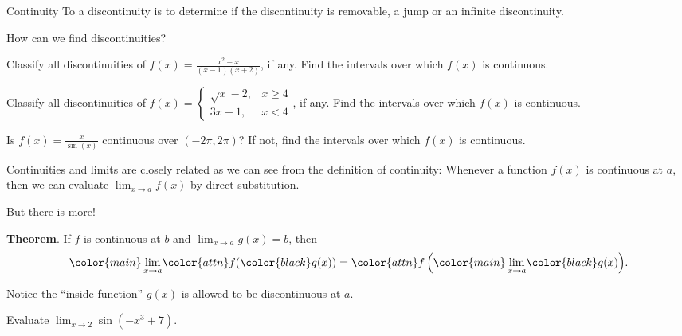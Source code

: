 \documentclass[../main.tex]{subfiles}
\begin{document}
\begin{lesson}{Continuity}
  To  a discontinuity is to determine if the discontinuity is removable, a jump or an infinite discontinuity.

  \faComments{} How can we find discontinuities?

  \begin{example}
    Classify all discontinuities of \(f(x) = \frac{x^{2}-x}{(x-1)(x+2)}\), if any.  Find the intervals over which \(f(x)\) is continuous.

  \end{example}

  \begin{example}
    Classify all discontinuities of \(f(x) = \begin{cases} \sqrt{x} - 2,& x \ge 4 \\ 3x - 1, &x < 4\end{cases}\), if any.  Find the intervals over which \(f(x)\) is continuous.

  \end{example}
  \clearpage

  \begin{example}
    Is \(f(x) = \frac{x}{\sin(x)}\) continuous over \((-2\pi, 2\pi)\)? If not, find the intervals over which \(f(x)\) is continuous.
  \end{example}

  
  Continuities and limits are closely related as we can see from the definition of continuity: Whenever a function \(f(x)\) is {continuous} at \(a\), then we can evaluate \(\lim_{x \to a} f(x)\) by direct substitution. 

  But there is more!

  \begin{mdframed}[style=withref]
    \textbf{Theorem}. If \(f\) is continuous at \(b\) and \(\lim_{x \to a} g(x) = b\), then 
    \[
      {\color{main} \lim_{x \to a}} {\color{attn}f({\color{black}g(x)})} = {\color{attn}f \left( {\color{main} \lim_{x \to a}} {\color{black} g(x) }\right)}.
    \]

  \end{mdframed}

  Notice the ``inside function'' \(g(x)\) is allowed to be discontinuous at \(a\).

  \begin{example}
    Evaluate \(\lim_{x \to 2} \sin( - x^{3} + 7  )\).
  \end{example}
  \clearpage


\end{lesson}
\end{document}
